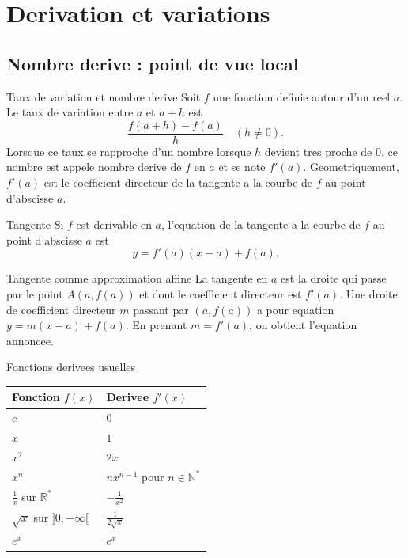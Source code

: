 \documentclass[11pt,a4paper]{article}
\newcommand{\R}{\mathbb{R}}
\newcommand{\N}{\mathbb{N}}
\begin{document}
\section{Derivation et variations}

\subsection{Nombre derive : point de vue local}
\begin{boitecours}{Taux de variation et nombre derive}
Soit $f$ une fonction definie autour d'un reel $a$. Le taux de variation entre $a$ et $a+h$ est
\[
\frac{f(a+h)-f(a)}{h}\quad(h\ne0).
\]
Lorsque ce taux se rapproche d'un nombre lorsque $h$ devient tres proche de $0$, ce nombre est appele nombre derive de $f$ en $a$ et se note $f'(a)$.
Geometriquement, $f'(a)$ est le coefficient directeur de la tangente a la courbe de $f$ au point d'abscisse $a$.
\end{boitecours}

\begin{boitecours}{Tangente}
Si $f$ est derivable en $a$, l'equation de la tangente a la courbe de $f$ au point d'abscisse $a$ est
\[
y=f'(a)(x-a)+f(a).
\]
\end{boitecours}

\begin{boitepreuve}{Tangente comme approximation affine}
La tangente en $a$ est la droite qui passe par le point $A(a,f(a))$ et dont le coefficient directeur est $f'(a)$. Une droite de coefficient directeur $m$ passant par $(a,f(a))$ a pour equation $y=m(x-a)+f(a)$. En prenant $m=f'(a)$, on obtient l'equation annoncee.
\end{boitepreuve}

\begin{boitecours}{Fonctions derivees usuelles}
\begin{center}
\begin{tabularx}{0.9\linewidth}{>{\centering\arraybackslash}X>{\centering\arraybackslash}X}
\toprule
Fonction $f(x)$ & Derivee $f'(x)$\\
\midrule
$c$ & $0$\\
$x$ & $1$\\
$x^2$ & $2x$\\
$x^n$ & $nx^{n-1}$ pour $n\in\N^*$\\
$\frac1x$ sur $\R^*$ & $-\frac1{x^2}$\\
$\sqrt{x}$ sur $]0,+\infty[$ & $\frac1{2\sqrt{x}}$\\
$e^x$ & $e^x$\\
\bottomrule
\end{tabularx}
\end{center}
\end{boitecours}
\end{document}

